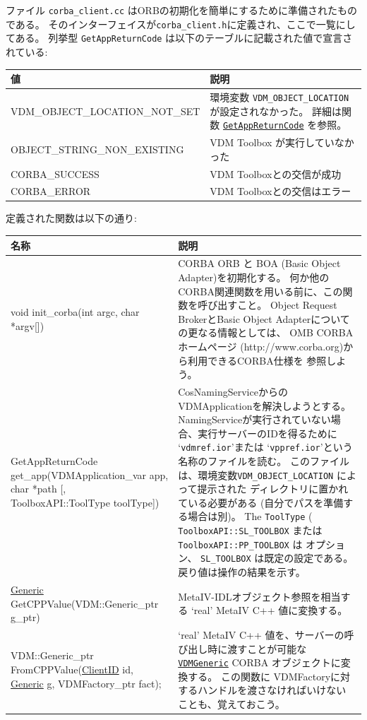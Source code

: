 \documentclass[\pformat,12pt]{jarticle}
\newcommand{\pbs}[1]{\let\temp=\\#1\let\\=\temp}
\newenvironment{interfacetable}{%
  \begin{longtable}{|>{\pbs\raggedright\ttfamily}p{6.6cm}%
                    |>{\pbs\raggedright}p{6.6cm}|} \hline
  \textrm{\bfseries 名称} &  \textbf{説明} \\ \hline
  \endhead
  }{\end{longtable}}
\newcommand{\Generic}{\hyperlink{interface.Generic}{Generic}}
\newcommand{\VDMGeneric}{\hyperlink{interface.Generic}{VDMGeneric}}
\newcommand{\ClientID}{\hyperlink{type.ClientID}{ClientID}}
\begin{document}
ファイル \texttt{corba\_client.cc} はORBの初期化を簡単にするために準備されたものである。
そのインターフェイスが\texttt{corba\_client.h}に定義され、ここで一覧にしてある。
列挙型 \texttt{GetAppReturnCode} は以下のテーブルに記載された値で宣言されている: 

\begin{longtable}{|>{\pbs\raggedright\ttfamily}p{6.6cm}|>{\pbs\raggedright}p{6.6cm}|} \hline
\textrm{\bfseries 値} & \textrm{\bfseries 説明}  \\ \hline
  VDM\_OBJECT\_LOCATION\_NOT\_SET
  & 環境変数 \texttt{VDM\_OBJECT\_LOCATION} が設定されなかった。
    詳細は関数
    \hyperlink{cppclient.GetAppReturnCode}{\texttt{GetAppReturnCode}}
    を参照。
\\ \hline
  OBJECT\_STRING\_NON\_EXISTING
  & VDM Toolbox が実行していなかった
\\ \hline
  CORBA\_SUCCESS
  & VDM Toolboxとの交信が成功
\\ \hline
  CORBA\_ERROR
  & VDM Toolboxとの交信はエラー
\\ \hline
\end{longtable}

定義された関数は以下の通り:

\begin{interfacetable}
void init\_corba(int argc, char *argv[])
  &  CORBA ORB と BOA (Basic Object Adapter)を初期化する。
    何か他のCORBA関連関数を用いる前に、この関数を呼び出すこと。
    Object Request BrokerとBasic Object Adapterについての更なる情報としては、
    OMB CORBAホームページ (http://www.corba.org)から利用できるCORBA仕様を
    参照しよう。
\\ \hline
\hyperdef{cppclient}{GetAppReturnCode}
GetAppReturnCode get\_app(VDMApplication\_var app, char *path [, ToolboxAPI::ToolType toolType])
  & CosNamingServiceからのVDMApplicationを解決しようとする。
    NamingServiceが実行されていない場合、実行サーバーのIDを得るために
    `{\tt vdmref.ior}'または `{\tt vppref.ior}'という名称のファイルを読む。
    このファイルは、環境変数\texttt{VDM\_OBJECT\_LOCATION} によって提示された
    ディレクトリに置かれている必要がある (自分でパスを準備する場合は別)。 
    The {\tt ToolType}
    ( {\tt ToolboxAPI::SL\_TOOLBOX} または {\tt ToolboxAPI::PP\_TOOLBOX} は
    オプション、 {\tt SL\_TOOLBOX} は既定の設定である。
    戻り値は操作の結果を示す。
\\ \hline
{\Generic} GetCPPValue(VDM::Generic\_ptr g\_ptr)
  &  MetaIV-IDLオブジェクト参照を相当する `real' MetaIV C++ 値に変換する。
\\ \hline
VDM::Generic\_ptr FromCPPValue({\ClientID} id, {\Generic} g, VDMFactory\_ptr fact);
  &   `real' MetaIV C++ 値を、サーバーの呼び出し時に渡すことが可能な
     \texttt{\VDMGeneric} CORBA オブジェクトに変換する。
    この関数に VDMFactoryに対するハンドルを渡さなければいけない
    ことも、覚えておこう。
\\ \hline
\end{interfacetable}
\end{document}
